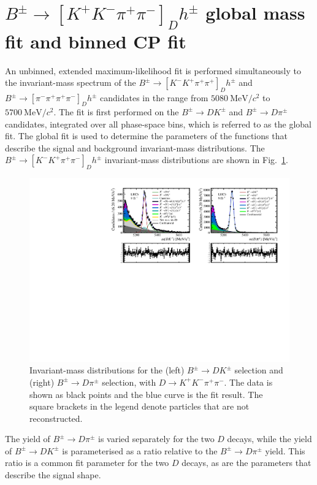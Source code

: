 \documentclass[12pt, a4paper, notitlepage, onecolumn]{article}
\begin{document}
\section{\texorpdfstring{$B^\pm\to[K^+K^-\pi^+\pi^-]_Dh^\pm$}{B2DhD2KKpipi} global mass fit and binned CP fit}
\noindent An unbinned, extended maximum-likelihood fit is performed simultaneously to the invariant-mass spectrum of the $B^\pm\to[K^-K^+\pi^+\pi^+]_Dh^\pm$ and $B^\pm\to[\pi^-\pi^+\pi^+\pi^-]_Dh^\pm$ candidates in the range from $\SI{5080}{\mega\eV/c^2}$ to $\SI{5700}{\mega\eV/c^2}$. The fit is first performed on the $B^\pm\to DK^\pm$ and $B^\pm\to D\pi^\pm$ candidates, integrated over all phase-space bins, which is referred to as the global fit. The global fit is used to determine the parameters of the functions that describe the signal and background invariant-mass distributions. The $B^\pm\to[K^-K^+\pi^+\pi^-]_Dh^\pm$ invariant-mass distributions are shown in Fig.~\ref{figure:Global_fit}.

\begin{figure}[tb]
    \centering
    \includegraphics[width=1.0\textwidth,trim={0 2.9cm 0 0},clip]{Plots/d2kkpipi_fiveL_allDP.pdf}
    \caption{Invariant-mass distributions for the (left) $B^\pm\to DK^\pm$ selection and (right) $B^\pm\to D\pi^\pm$ selection, with $D\to K^+K^-\pi^+\pi^-$. The data is shown as black points and the blue curve is the fit result. The square brackets in the legend denote particles that are not reconstructed.}
    \label{figure:Global_fit}
\end{figure}

The yield of $B^\pm\to D\pi^\pm$ is varied separately for the two $D$ decays, while the yield of $B^\pm\to DK^\pm$ is parameterised as a ratio relative to the $B^\pm\to D\pi^\pm$ yield. This ratio is a common fit parameter for the two $D$ decays, as are the parameters that describe the signal shape.
\end{document}

